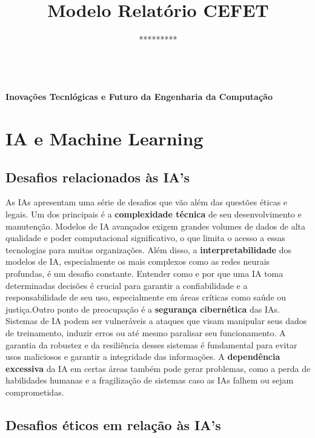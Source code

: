 \documentclass[12pt,a4paper]{article}
\author{*********} %
\makeatletter
\newcommand{\CEFETtitulo}[1]{
\begin{center}
\begin{Large}
\textbf{\\#1\\}
\end{Large}
\vspace{.5cm}
{\large \textbf{\@author}} %
\end{center}
\vspace{.5cm}
}
\newcommand{\CEFETopen}{
    \selectlanguage{brazilian}
    \pagestyle{otherpage}
    \thispagestyle{firstpage}
}
\makeatother
\begin{document}
    \title{Modelo Relatório CEFET} %
    \CEFETopen
    \CEFETtitulo{Inovações Tecnlógicas e Futuro da Engenharia da Computação}


    \section{IA e Machine Learning}

   \subsection{Desafios relacionados às IA's}

      As IAs apresentam uma série de desafios que vão além das questões éticas e legais. Um dos principais é a \textbf{complexidade técnica} de seu desenvolvimento e manutenção. 
    Modelos de IA avançados exigem grandes volumes de dados de alta qualidade e poder computacional significativo, o que limita o acesso a essas tecnologias para muitas 
    organizações. Além disso, a \textbf{interpretabilidade} dos modelos de IA, especialmente os mais complexos como as redes neurais profundas, é um desafio constante. 
    Entender como e por que uma IA toma determinadas decisões é crucial para garantir a confiabilidade e a responsabilidade de seu uso, especialmente em áreas críticas 
    como saúde ou justiça.Outro ponto de preocupação é a \textbf{segurança cibernética} das IAs. Sistemas de IA podem ser vulneráveis a ataques que visam manipular seus 
    dados de treinamento, induzir erros ou até mesmo paralisar seu funcionamento. A garantia da robustez e da resiliência desses sistemas é fundamental para evitar usos 
    maliciosos e garantir a integridade das informações. A \textbf{dependência excessiva} da IA em certas áreas também pode gerar problemas, como a perda de habilidades 
    humanas e a fragilização de sistemas caso as IAs falhem ou sejam comprometidas.

    \subsection{Desafios éticos em relação às IA's}
\end{document}
